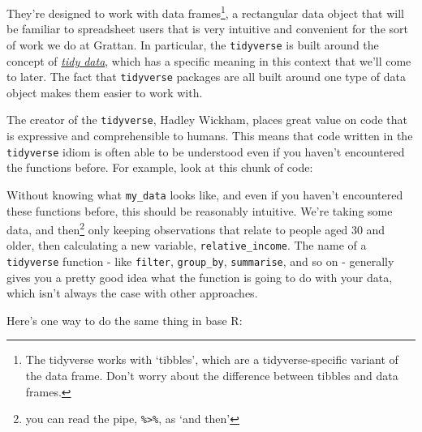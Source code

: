 \documentclass[]{book}
\newenvironment{Shaded}{\begin{snugshade}}{\end{snugshade}}
\newcommand{\DataTypeTok}[1]{\textcolor[rgb]{0.13,0.29,0.53}{#1}}
\newcommand{\DecValTok}[1]{\textcolor[rgb]{0.00,0.00,0.81}{#1}}
\newcommand{\KeywordTok}[1]{\textcolor[rgb]{0.13,0.29,0.53}{\textbf{#1}}}
\newcommand{\NormalTok}[1]{#1}
\newcommand{\OperatorTok}[1]{\textcolor[rgb]{0.81,0.36,0.00}{\textbf{#1}}}
\newcommand{\StringTok}[1]{\textcolor[rgb]{0.31,0.60,0.02}{#1}}
\let\rmarkdownfootnote\footnote%
\def\footnote{\protect\rmarkdownfootnote}
\begin{document}
They're designed to work with data frames\footnote{The tidyverse works with `tibbles', which are a tidyverse-specific variant of the data frame. Don't worry about the difference between tibbles and data frames.}, a rectangular data object that will be familiar to spreadsheet users that is very intuitive and convenient for the sort of work we do at Grattan. In particular, the \texttt{tidyverse} is built around the concept of \href{https://cran.r-project.org/web/packages/tidyr/vignettes/tidy-data.html}{\emph{tidy data}}, which has a specific meaning in this context that we'll come to later. The fact that \texttt{tidyverse} packages are all built around one type of data object makes them easier to work with.

The creator of the \texttt{tidyverse}, Hadley Wickham, places great value on code that is expressive and comprehensible to humans. This means that code written in the \texttt{tidyverse} idiom is often able to be understood even if you haven't encountered the functions before. For example, look at this chunk of code:

\begin{Shaded}
\end{Shaded}

Without knowing what \texttt{my\_data} looks like, and even if you haven't encountered these functions before, this should be reasonably intuitive. We're taking some data, and then\footnote{you can read the pipe, \texttt{\%\textgreater{}\%}, as `and then'} only keeping observations that relate to people aged 30 and older, then calculating a new variable, \texttt{relative\_income}. The name of a \texttt{tidyverse} function - like \texttt{filter}, \texttt{group\_by}, \texttt{summarise}, and so on - generally gives you a pretty good idea what the function is going to do with your data, which isn't always the case with other approaches.

Here's one way to do the same thing in base R:

\begin{Shaded}
\end{Shaded}
\end{document}

